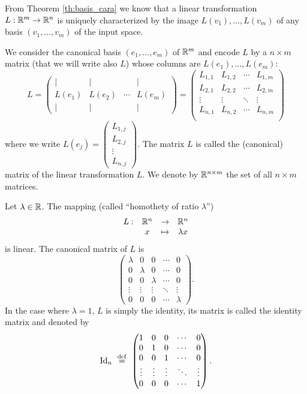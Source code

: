 \documentclass[11pt,nocut]{article}
\begin{document}
From Theorem \ref{th:basis_cara} we know that a linear transformation $L: \mathbb{R}^m \to \mathbb{R}^n$ is uniquely characterized by the image $L(v_1), \dots, L(v_m)$ of any basis $(v_1, \dots, v_m)$ of the input space.

We consider the canonical basis $(e_1, \dots, e_m)$ of $\mathbb{R}^m$ and encode $L$ by a $n \times m$ matrix (that we will write also $L$) whose columns are $L(e_1), \dots, L(e_m)$:
$$
L =
\begin{pmatrix}
	| & | & & | \\
	L(e_1) & L(e_2) & \cdots& L(e_m) \\
	| & | & & |
\end{pmatrix}
= 
\begin{pmatrix}
	L_{1,1} & L_{1,2} & \cdots & L_{1,m} \\
	L_{2,1} & L_{2,2} & \cdots & L_{2,m} \\
	\vdots & \vdots & \ddots & \vdots \\
	L_{n,1} & L_{n,2} & \cdots & L_{n,m} \\
\end{pmatrix}
$$
where we write $L(e_j) = 
\begin{pmatrix}
	L_{1,j} \\
	L_{2,j}\\
	\vdots \\
	L_{n,j}
\end{pmatrix}$.
The matrix $L$ is called the (canonical) matrix of the linear transformation $L$. We denote by $\mathbb{R}^{n \times m}$ the set of all $n \times m$ matrices.

\begin{example}[Homothety]
	Let $\lambda \in \mathbb{R}$. The mapping (called ``homothety of ratio $\lambda$'')
	$$
	\begin{array}{cccc}
		L: & \mathbb{R}^n & \to & \mathbb{R}^n \\
		   & x & \mapsto & \lambda x
	\end{array}
	$$
	is linear. The canonical matrix of $L$ is 
	$$
	\begin{pmatrix}
		\lambda & 0 & 0 & \cdots & 0 \\
		0 & \lambda & 0 & \cdots & 0 \\
		0 & 0 &\lambda &  \cdots & 0 \\
		\vdots & \vdots& \vdots & \ddots & \vdots \\
		0 & 0 & 0 & \cdots & \lambda
	\end{pmatrix}
	.
	$$
	In the case where $\lambda = 1$, $L$ is simply the identity, its matrix is called the identity matrix and denoted by
	$${{\rm Id}}_n
	\ \overset{\rm def}{=} \
	\begin{pmatrix}
		1 & 0 & 0 & \cdots & 0 \\
		0 & 1 & 0 & \cdots & 0 \\
		0 & 0 &1 &  \cdots & 0 \\
		\vdots & \vdots& \vdots & \ddots & \vdots \\
		0 & 0 & 0 & \cdots & 1
	\end{pmatrix}.
	$$
\end{example}
\end{document}

